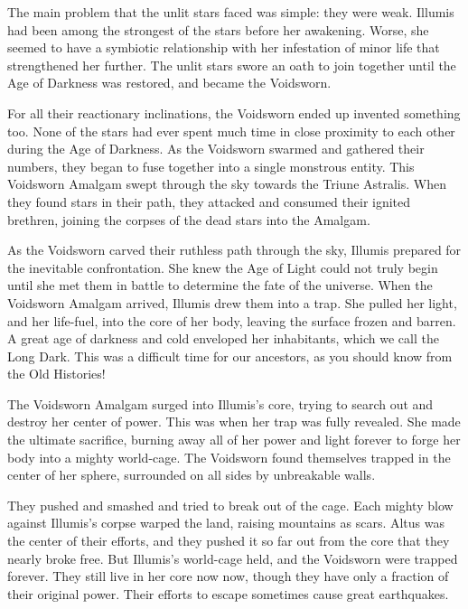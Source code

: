   The main problem that the unlit stars faced was simple: they were weak.
  Illumis had been among the strongest of the stars before her awakening.
  Worse, she seemed to have a symbiotic relationship with her infestation of minor life that strengthened her further.
  The unlit stars swore an oath to join together until the Age of Darkness was restored, and became the Voidsworn.

  For all their reactionary inclinations, the Voidsworn ended up invented something too.
  None of the stars had ever spent much time in close proximity to each other during the Age of Darkness.
  As the Voidsworn swarmed and gathered their numbers, they began to fuse together into a single monstrous entity.
  This Voidsworn Amalgam swept through the sky towards the Triune Astralis.
  When they found stars in their path, they attacked and consumed their ignited brethren, joining the corpses of the dead stars into the Amalgam.

  As the Voidsworn carved their ruthless path through the sky, Illumis prepared for the inevitable confrontation.
  She knew the Age of Light could not truly begin until she met them in battle to determine the fate of the universe.
  When the Voidsworn Amalgam arrived, Illumis drew them into a trap.
  She pulled her light, and her life-fuel, into the core of her body, leaving the surface frozen and barren.
  A great age of darkness and cold enveloped her inhabitants, which we call the Long Dark.
  This was a difficult time for our ancestors, as you should know from the Old Histories!

  The Voidsworn Amalgam surged into Illumis's core, trying to search out and destroy her center of power.
  This was when her trap was fully revealed.
  She made the ultimate sacrifice, burning away all of her power and light forever to forge her body into a mighty world-cage.
  The Voidsworn found themselves trapped in the center of her sphere, surrounded on all sides by unbreakable walls.

  They pushed and smashed and tried to break out of the cage.
  Each mighty blow against Illumis's corpse warped the land, raising mountains as scars.
  Altus was the center of their efforts, and they pushed it so far out from the core that they nearly broke free.
  But Illumis's world-cage held, and the Voidsworn were trapped forever.
  They still live in her core now now, though they have only a fraction of their original power.
  Their efforts to escape sometimes cause great earthquakes.

